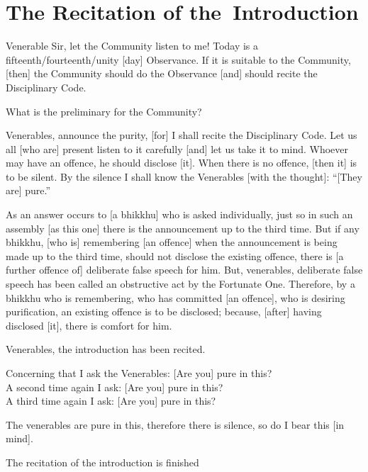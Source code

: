 
\section{The Recitation of \mbox{the}~Introduction}
\label{introduction}

\ifninebythirteenversion\vspace{0.45em}\fi
\ifafiveversion\vspace{0.25em}\fi

Venerable Sir, let the Community listen to me! Today is a fifteenth/fourteenth/unity [day] Observance. If it is suitable to the Community, [then] the Community should do the Observance [and] should recite the Disciplinary Code.

What is the preliminary for the Community?

Venerables, announce the purity, [for] I shall recite the Disciplinary Code. Let us all [who are] present listen to it carefully [and] let us take it to mind. Whoever may have an offence, he should disclose [it]. When there is no offence, [then it] is to be silent. By the silence I shall know the Venerables [with the thought]: ``[They are] pure.''

As an answer occurs to [a bhikkhu] who is asked individually, just so in such an assembly [as this one] there is the announcement up to the third time. But if any bhikkhu, [who is] remembering [an offence] when the announcement is being made up to the third time, should not disclose the existing offence, there is [a further offence of] deliberate false speech for him. \ifninebythirteenversion\clearpage\fi But, venerables, deliberate false speech has been called an obstructive act by the Fortunate One. Therefore, by a bhikkhu who is remembering, who has committed [an offence], who is desiring purification, an existing offence is to be disclosed; because, [after] having disclosed [it], there is comfort for him.

\medskip

\begin{center}
	Venerables, the introduction has been recited.

	\smallskip

	Concerning that I ask the Venerables: [Are you] pure in this?\\
	A second time again I ask: [Are you] pure in this?\\
	A third time again I ask: [Are you] pure in this?

	\smallskip

	The venerables are pure in this, therefore there is silence, so do I bear this [in mind].
\end{center}

\begin{outro}
	The recitation of the introduction is finished
\end{outro}

\clearpage

